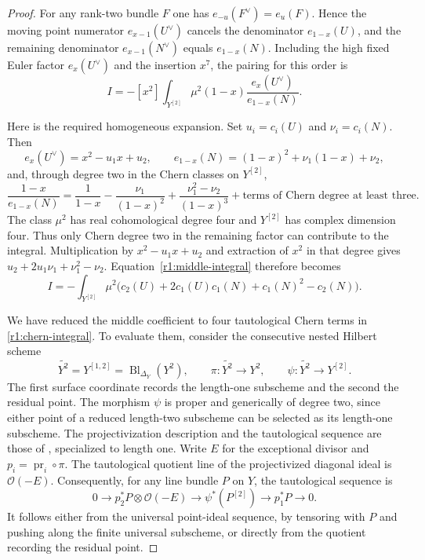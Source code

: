 \begin{proof}
For any rank-two bundle $F$ one has
$e_{-u}(F^\vee)=e_u(F)$.  Hence the moving point numerator
$e_{x-1}(U^\vee)$ cancels the denominator $e_{1-x}(U)$, and the
remaining denominator $e_{x-1}(N^\vee)$ equals $e_{1-x}(N)$.
Including the high fixed Euler factor $e_x(U^\vee)$ and the
insertion $x^7$, the pairing for this order is
\begin{equation}\label{r1:middle-integral}
 I=-[x^2]\int_{Y^{[2]}}
       \mu^2(1-x)\frac{e_x(U^\vee)}{e_{1-x}(N)}.
\end{equation}

Here is the required homogeneous expansion.  Set
$u_i=c_i(U)$ and $\nu_i=c_i(N)$.  Then
\[
 e_x(U^\vee)=x^2-u_1x+u_2,\qquad
 e_{1-x}(N)=(1-x)^2+\nu_1(1-x)+\nu_2,
\]
and, through degree two in the Chern classes on $Y^{[2]}$,
\[
 \frac{1-x}{e_{1-x}(N)}
 =\frac1{1-x}-\frac{\nu_1}{(1-x)^2}
       +\frac{\nu_1^2-\nu_2}{(1-x)^3}
       +\text{terms of Chern degree at least three}.
\]
The class $\mu^2$ has real cohomological degree four and $Y^{[2]}$
has complex dimension four.  Thus only Chern degree two in the
remaining factor can contribute to the integral.  Multiplication
by $x^2-u_1x+u_2$ and extraction of $x^2$ in that degree gives
$u_2+2u_1\nu_1+\nu_1^2-\nu_2$.  Equation~\eqref{r1:middle-integral}
therefore becomes
\begin{equation}\label{r1:chern-integral}
 I=-\int_{Y^{[2]}}\mu^2
   \bigl(c_2(U)+2c_1(U)c_1(N)+c_1(N)^2-c_2(N)\bigr).
\end{equation}

We have reduced the middle coefficient to four tautological Chern
terms in \eqref{r1:chern-integral}. To evaluate them, consider the
consecutive nested Hilbert scheme
\[
 \widetilde{Y^2}=Y^{[1,2]}=\operatorname{Bl}_{\Delta_Y}(Y^2),
 \qquad
 \pi:\widetilde{Y^2}\longrightarrow Y^2,
 \qquad
 \psi:\widetilde{Y^2}\longrightarrow Y^{[2]}.
\]
The first surface coordinate records the length-one subscheme and
the second the residual point.  The morphism $\psi$ is proper and
generically of degree two, since either point of a reduced length-two
subscheme can be selected as its length-one subscheme.  The
projectivization description and the tautological sequence are those
of \cite[\S1, equations~(3)--(6), and Lemma~2.1]{EGL}, specialized
to length one.  Write $E$ for the exceptional divisor and
$p_i=\operatorname{pr}_i\circ\pi$.  The tautological quotient line
of the projectivized diagonal ideal is $\mathcal O(-E)$.
Consequently, for any line bundle $P$ on $Y$, the tautological
sequence is
\begin{equation}\label{r1:tautological-sequence}
 0\longrightarrow p_2^*P\otimes\mathcal O(-E)
 \longrightarrow\psi^*(P^{[2]})
 \longrightarrow p_1^*P\longrightarrow0.
\end{equation}
It follows either from the universal point-ideal sequence, by
tensoring with $P$ and pushing along the finite universal subscheme,
or directly from the quotient recording the residual point.


\end{proof}
